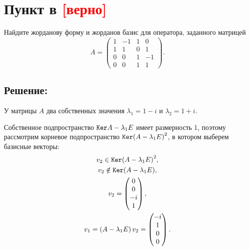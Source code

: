 \documentclass[12pt]{article}
\begin{document}
    \section*{Пункт в \textcolor{red}{[верно]}}
    Найдите жорданову форму и жорданов базис для оператора, заданного матрицей
    \[
        A = \begin{pmatrix}
                1 & -1 & 1 & 0  \\
                1 & 1  & 0 & 1  \\
                0 & 0  & 1 & -1 \\
                0 & 0  & 1 & 1
        \end{pmatrix} .
    \]

    \subsection*{Решение:}
    У матрицы $A$ два собственных значения $\lambda_1 = 1 - i$ и $\lambda_2 = 1 + i$.

    Собственное подпространство $\mathtt{Ker}{A - \lambda_1 E}$ имеет размерность 1, поэтому рассмотрим корневое подпространство $\mathtt{Ker}{\left ( A - \lambda_1 E \right )^2}$,
    в котором выберем базисные векторы:
    \begin{gather*}
        v_2 \in \mathtt{Ker}{\left ( A - \lambda_1 E \right)^2}, \\
        v_2 \notin \mathtt{Ker}{\left ( A - \lambda_1 E \right)}, \\
        v_2 = \begin{pmatrix}
                  0 \\ 0 \\ -i \\ 1
        \end{pmatrix}, \\
        v_1
        = \left ( A - \lambda_1 E \right) v_2
        = \begin{pmatrix}
              -i \\ 1 \\ 0 \\ 0
        \end{pmatrix}.
    \end{gather*}
\end{document}
